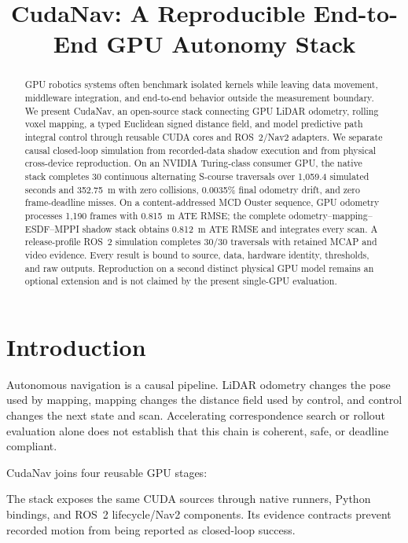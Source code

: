 \documentclass[conference]{IEEEtran}
\title{CudaNav: A Reproducible End-to-End GPU Autonomy Stack}
\author{\IEEEauthorblockN{Anonymous Authors}}
\begin{document}
\maketitle

\begin{abstract}
GPU robotics systems often benchmark isolated kernels while leaving data
movement, middleware integration, and end-to-end behavior outside the
measurement boundary. We present CudaNav, an open-source stack connecting GPU
LiDAR odometry, rolling voxel mapping, a typed Euclidean signed distance
field, and model predictive path integral control through reusable CUDA cores
and ROS~2/Nav2 adapters. We separate causal closed-loop simulation from
recorded-data shadow execution and from physical cross-device reproduction.
On an NVIDIA Turing-class consumer GPU, the native stack completes 30 continuous
alternating S-course traversals over 1,059.4 simulated seconds and 352.75~m
with zero collisions, 0.0035\% final odometry drift, and zero frame-deadline
misses. On a content-addressed MCD Ouster sequence, GPU odometry processes
1,190 frames with 0.815~m ATE RMSE; the complete
odometry--mapping--ESDF--MPPI shadow stack obtains 0.812~m ATE RMSE and
integrates every scan. A release-profile ROS~2 simulation completes 30/30
traversals with retained MCAP and video evidence. Every result is bound to
source, data, hardware identity, thresholds, and raw outputs. Reproduction on
a second distinct physical GPU model remains an optional extension and is not
claimed by the present single-GPU evaluation.
\end{abstract}

\section{Introduction}
Autonomous navigation is a causal pipeline. LiDAR odometry changes the pose
used by mapping, mapping changes the distance field used by control, and
control changes the next state and scan. Accelerating correspondence search
or rollout evaluation alone does not establish that this chain is coherent,
safe, or deadline compliant.

CudaNav joins four reusable GPU stages:
\begin{center}
\end{center}
The stack exposes the same CUDA sources through native runners, Python
bindings, and ROS~2 lifecycle/Nav2 components. Its evidence contracts prevent
recorded motion from being reported as closed-loop success.
\end{document}
